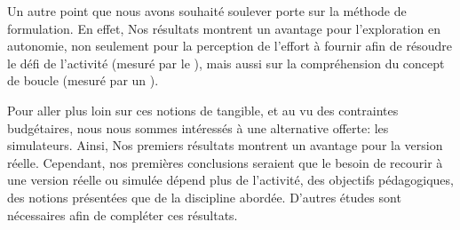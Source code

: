     Un autre point que nous avons souhaité soulever porte sur la méthode de formulation. En effet,
    Nos résultats montrent un avantage pour l'exploration en autonomie, non seulement pour la perception de l'effort à fournir afin de résoudre le défi de l'activité (mesuré par le ), mais aussi sur la compréhension du concept de boucle (mesuré par un ).\par%
    Pour aller plus loin sur ces notions de tangible, et au vu des contraintes budgétaires, nous nous sommes intéressés à une alternative offerte: les simulateurs. Ainsi,
    Nos premiers résultats montrent un avantage pour la version réelle. Cependant, nos premières conclusions seraient que le besoin de recourir à une version réelle ou simulée dépend plus de l'activité, des objectifs pédagogiques, des notions présentées que de la discipline abordée. D'autres études sont nécessaires afin de compléter ces résultats.
